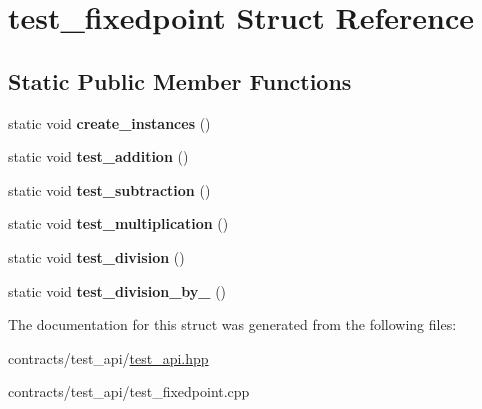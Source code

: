 \hypertarget{structtest__fixedpoint}{}\section{test\+\_\+fixedpoint Struct Reference}
\label{structtest__fixedpoint}
\subsection*{Static Public Member Functions}
\begin{DoxyCompactItemize}
\item 
\mbox{\label{structtest__fixedpoint_a3fc6f1101eea8a101e5960723637091b}} 
static void {\bfseries create\+\_\+instances} ()
\item 
\mbox{\label{structtest__fixedpoint_a7b0d9107e92120e3a65d84fe7e9746de}} 
static void {\bfseries test\+\_\+addition} ()
\item 
\mbox{\label{structtest__fixedpoint_a252684344c37e6526c48b643d8b677a9}} 
static void {\bfseries test\+\_\+subtraction} ()
\item 
\mbox{\label{structtest__fixedpoint_a9713786bc0485ee9cc2c846ca035e881}} 
static void {\bfseries test\+\_\+multiplication} ()
\item 
\mbox{\label{structtest__fixedpoint_adc3a326dc8b2dc403ccf5f254cf04732}} 
static void {\bfseries test\+\_\+division} ()
\item 
\mbox{\label{structtest__fixedpoint_a749ffa6609c6064d7d2870edc483186e}} 
static void {\bfseries test\+\_\+division\+\_\+by\+\_} ()
\end{DoxyCompactItemize}


The documentation for this struct was generated from the following files\+:\begin{DoxyCompactItemize}
\item 
contracts/test\+\_\+api/\mbox{\hyperlink{test__api_8hpp}{test\+\_\+api.\+hpp}}\item 
contracts/test\+\_\+api/test\+\_\+fixedpoint.\+cpp\end{DoxyCompactItemize}
